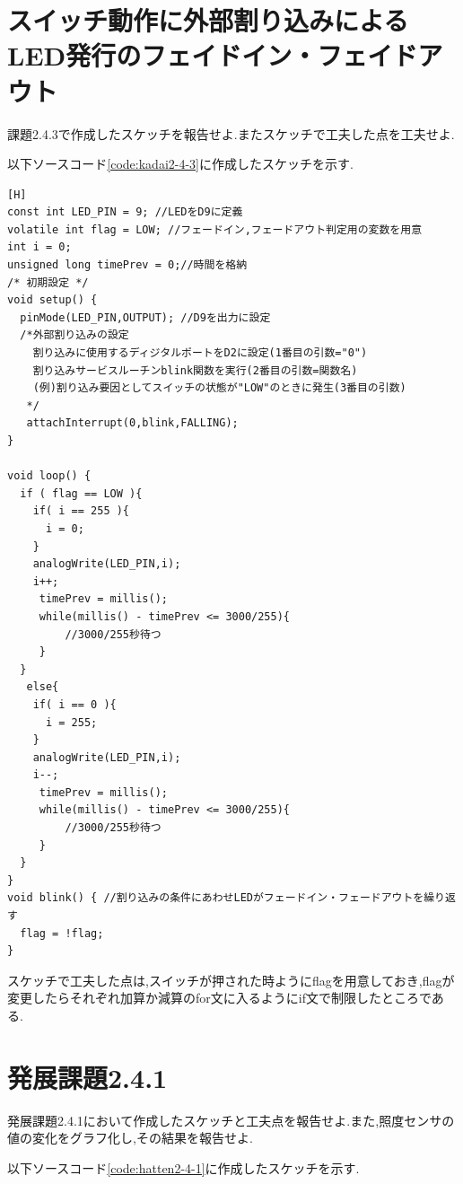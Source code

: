 \documentclass{jarticle}
\begin{document}
\section{スイッチ動作に外部割り込みによるLED発行のフェイドイン・フェイドアウト}
課題2.4.3で作成したスケッチを報告せよ.またスケッチで工夫した点を工夫せよ.

以下ソースコード\ref{code:kadai2-4-3}に作成したスケッチを示す.

\begin{lstlisting}[caption = 課題2.4.3,label=code:kadai2-4-3][H]
const int LED_PIN = 9; //LEDをD9に定義
volatile int flag = LOW; //フェードイン,フェードアウト判定用の変数を用意
int i = 0;
unsigned long timePrev = 0;//時間を格納
/* 初期設定 */
void setup() {
  pinMode(LED_PIN,OUTPUT); //D9を出力に設定
  /*外部割り込みの設定
    割り込みに使用するディジタルポートをD2に設定(1番目の引数="0")
    割り込みサービスルーチンblink関数を実行(2番目の引数=関数名)
    (例)割り込み要因としてスイッチの状態が"LOW"のときに発生(3番目の引数)
   */
   attachInterrupt(0,blink,FALLING);
}

void loop() {
  if ( flag == LOW ){
    if( i == 255 ){
      i = 0;
    }
    analogWrite(LED_PIN,i);
    i++;
	 timePrev = millis();
	 while(millis() - timePrev <= 3000/255){
		 //3000/255秒待つ
	 }
  }
   else{
    if( i == 0 ){
      i = 255;
    }
    analogWrite(LED_PIN,i);
    i--;
	 timePrev = millis();
	 while(millis() - timePrev <= 3000/255){
		 //3000/255秒待つ
	 }
  }
}
void blink() { //割り込みの条件にあわせLEDがフェードイン・フェードアウトを繰り返す
  flag = !flag;
}
\end{lstlisting}

スケッチで工夫した点は,スイッチが押された時ようにflagを用意しておき,flagが変更したらそれぞれ加算か減算のfor文に入るようにif文で制限したところである.


\section{発展課題2.4.1}
発展課題2.4.1において作成したスケッチと工夫点を報告せよ.また,照度センサの値の変化をグラフ化し,その結果を報告せよ.

以下ソースコード\ref{code:hatten2-4-1}に作成したスケッチを示す.
\end{document}
